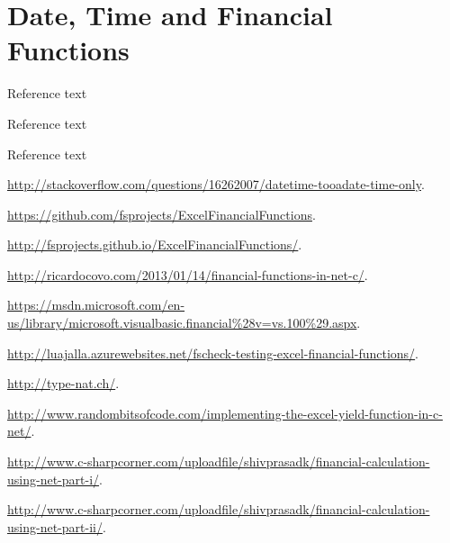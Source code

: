 

\chapter{Date, Time and Financial Functions}
\label{ElementaryFinancialFunctions} 

Reference text \cite{Benninga2008}

Reference text \cite{Benninga2010}

Reference text \cite{Day_2010}






\vpara
\href{http://stackoverflow.com/questions/16262007/datetime-tooadate-time-only}{http://stackoverflow.com/questions/16262007/datetime-tooadate-time-only}.



\vpara
\href{https://github.com/fsprojects/ExcelFinancialFunctions}{https://github.com/fsprojects/ExcelFinancialFunctions}.


\vpara
\href{http://fsprojects.github.io/ExcelFinancialFunctions/}{http://fsprojects.github.io/ExcelFinancialFunctions/}.


\vpara
\href{http://ricardocovo.com/2013/01/14/financial-functions-in-net-c/}{http://ricardocovo.com/2013/01/14/financial-functions-in-net-c/}.


\vpara
\href{https://msdn.microsoft.com/en-us/library/microsoft.visualbasic.financial\%28v=vs.100\%29.aspx}{https://msdn.microsoft.com/en-us/library/microsoft.visualbasic.financial\%28v=vs.100\%29.aspx}.



\vpara
\href{http://luajalla.azurewebsites.net/fscheck-testing-excel-financial-functions/}{http://luajalla.azurewebsites.net/fscheck-testing-excel-financial-functions/}.



\vpara
\href{http://type-nat.ch/}{http://type-nat.ch/}.


\vpara
\href{http://www.randombitsofcode.com/implementing-the-excel-yield-function-in-c-net/}{http://www.randombitsofcode.com/implementing-the-excel-yield-function-in-c-net/}.



\vpara
\href{http://www.c-sharpcorner.com/uploadfile/shivprasadk/financial-calculation-using-net-part-i/}{http://www.c-sharpcorner.com/uploadfile/shivprasadk/financial-calculation-using-net-part-i/}.



\vpara
\href{http://www.c-sharpcorner.com/uploadfile/shivprasadk/financial-calculation-using-net-part-ii/}{http://www.c-sharpcorner.com/uploadfile/shivprasadk/financial-calculation-using-net-part-ii/}.



